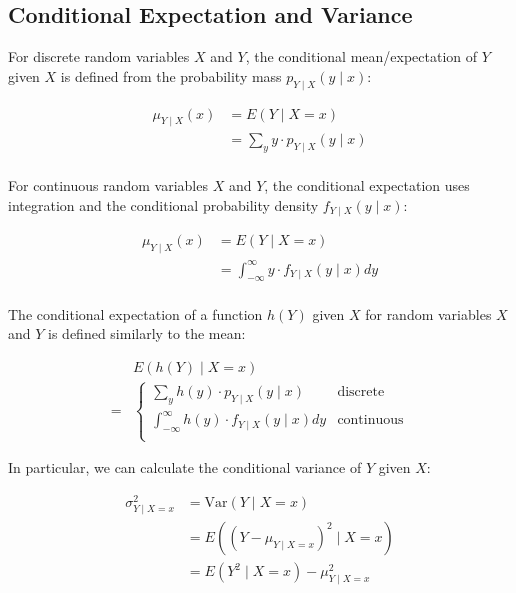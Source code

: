 \subsection{Conditional Expectation and Variance}

For discrete random variables $X$ and $Y$, the conditional mean/expectation of $Y$ given $X$ is defined from the probability mass $p_{Y\mid X}(y\mid x)$:

\begin{align*}
    \mu_{Y\mid X}(x) & = E(Y\mid X=x)                          \\
                     & = \sum_{y} y\cdot  p_{Y\mid X}(y\mid x) \\
\end{align*}

For continuous random variables $X$ and $Y$, the conditional expectation uses integration and the conditional probability density $f_{Y\mid X}(y\mid x)$:

\begin{align*}
    \mu_{Y\mid X}(x) & = E(Y\mid X=x)                                           \\
                     & = \int_{-\infty}^{\infty} y\cdot f_{Y\mid X}(y\mid x) dy \\
\end{align*}

The conditional expectation of a function $h(Y)$ given $X$ for random variables $X$ and $Y$ is defined similarly to the mean:

\begin{align*}
      & E(h(Y)\mid X=x)                                                               \\
    = & \begin{cases}
            \sum_{y} h(y)\cdot p_{Y\mid X}(y\mid x)                   & \text{discrete}   \\
            \int_{-\infty}^{\infty} h(y)\cdot f_{Y\mid X}(y\mid x) dy & \text{continuous} \\
        \end{cases}
\end{align*}

In particular, we can calculate the conditional variance of $Y$ given $X$:

\begin{align*}
    \sigma^2_{Y\mid X=x} & = \text{Var}(Y\mid X=x)              \\
                         & = E((Y-\mu_{Y\mid X=x})^2\mid X=x)   \\
                         & = E(Y^2\mid X=x) - \mu_{Y\mid X=x}^2 \\
\end{align*}

